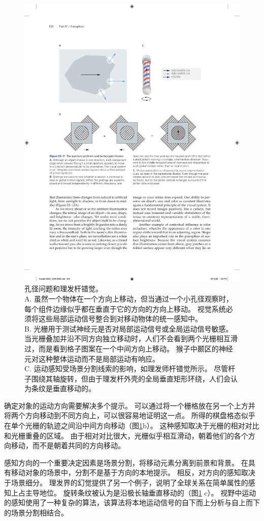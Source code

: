 \begin{figure}[htbp]
	\centering
	\includegraphics[width=0.8\linewidth]{chap23/fig_23_11}
	\caption{孔径问题和理发杆错觉。\protect\\
		A. 虽然一个物体在一个方向上移动，但当通过一个小孔径观察时，每个组件边缘似乎都在垂直于它的方向的方向上移动。
		视觉系统必须将这些局部运动信号整合到对移动物体的统一感知中。\protect\\
		B. 光栅用于测试神经元是否对局部运动信号或全局运动信号敏感。
		当光栅叠加并沿不同方向独立移动时，人们不会看到两个光栅相互滑过，而是看到格子图案在一个中间方向上移动。
		猴子中颞区的神经元对这种整体运动而不是局部运动有响应。\protect\\
		C. 运动感知受场景分割线索的影响，如理发师杆错觉所示。
		尽管杆子围绕其轴旋转，但由于理发杆外壳的全局垂直矩形环绕，人们会认为条纹是垂直移动的。}
	\label{fig:23_11}
\end{figure}


确定对象的运动方向需要解决多个提示。
可以通过将一个栅格放在另一个上方并将两个方向移动到不同方向上，可以很容易地证明这一点。
所得的棋盘格态似乎在单个光栅的轨迹之间沿中间方向移动（图\ref{fig:23_11}b）。 
这种感知取决于光栅的相对对比和光栅重叠的区域。 
由于相对对比很大，光栅似乎相互滑动，朝着他们的各个方向移动，而不是朝着共同的方向移动。


感知方向的一个重要决定因素是场景分割，将移动元素分离到前景和背景。
在具有移动对象的场景中，分割不是基于方向的本地提示。
相反，对方向的感知取决于场景细分。
理发界的幻觉提供了另一个例子，说明了全球关系在简单属性的感知上占主导地位。
旋转条纹被认为是沿极长轴垂直移动的（图\ref{fig:23_11} c）。 
视野中运动的感知使用了一种复杂的算法，该算法将本地运动信号的自下而上分析与自上而下的场景分割相结合。


